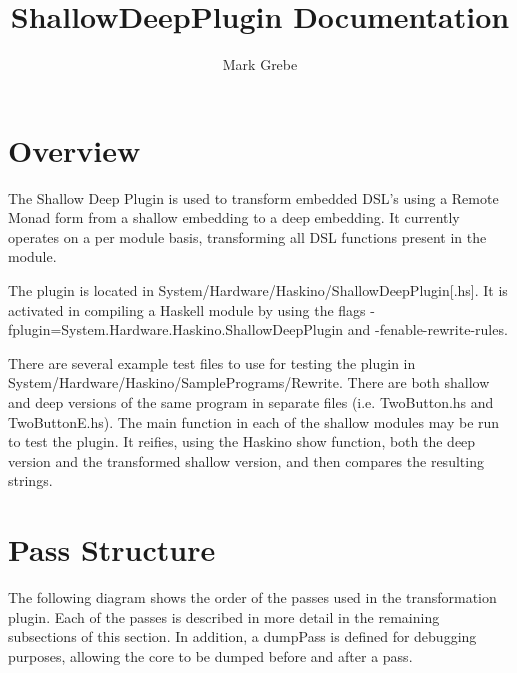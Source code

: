 \documentclass[11pt, oneside]{article}   	%
\title{ShallowDeepPlugin Documentation}
\author{Mark Grebe}
\begin{document}
\maketitle

\section{Overview}

The Shallow Deep Plugin is used to transform embedded DSL's using a
Remote Monad form from a shallow embedding to a deep embedding.
It currently operates on a per module basis, transforming all DSL
functions present in the module.

The plugin is located in System/Hardware/Haskino/ShallowDeepPlugin[.hs].
It is activated in compiling a Haskell module by using the flags \break
-fplugin=System.Hardware.Haskino.ShallowDeepPlugin and 
-fenable-rewrite-rules.

There are several example test files to use for testing the plugin in \break
System/Hardware/Haskino/SamplePrograms/Rewrite.  There are both
shallow and deep versions of the same program in separate files (i.e. 
TwoButton.hs and TwoButtonE.hs).  The main function in each of the
shallow modules may be run to test the plugin.  It reifies, using the
Haskino show function, both the deep version and the transformed
shallow version, and then compares the resulting strings.

\section{Pass Structure}

The following diagram shows the order of the passes used in the transformation
plugin.  Each of the passes is described in more detail in the remaining subsections of this
section.  In addition, a dumpPass is defined for debugging purposes, allowing the
core to be dumped before and after a pass.

\end{document}

